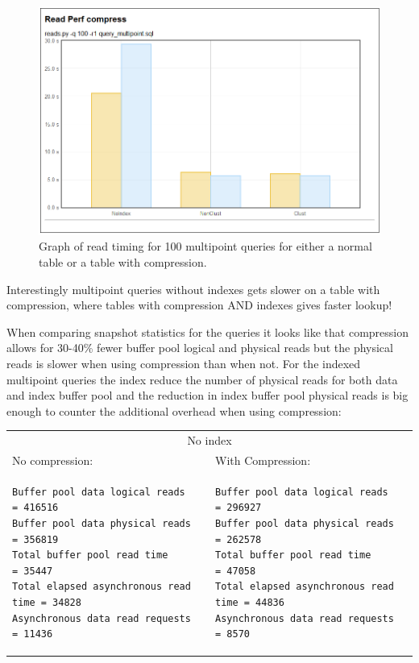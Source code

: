 \begin{figure}
  \centering
  \includegraphics[width=12cm]{assignment3/readcomp}
  \caption[Read performance - Clustering Index compress]{Graph of read timing
  for 100 multipoint queries for either a normal table or a table with
  compression.}\label{fig:readcomp}
\end{figure}

Interestingly multipoint queries without indexes gets slower on a table with
compression, where tables with compression AND indexes gives faster lookup!

When comparing snapshot statistics for the queries it looks like that
compression allows for 30-40\% fewer buffer pool logical and physical reads  but
the physical reads is slower when using compression than when not. For the
indexed multipoint queries the index reduce the number of physical reads for
both data and index buffer pool and the reduction in index buffer pool physical
reads is big enough to counter the additional overhead when using compression:

\noindent\begin{tabular}{p{6.6cm}|p{6.6cm}}
  \multicolumn{2}{c}{No index}\\
No compression:&With Compression:\\ \hline
\noindent\footnotesize\protect\begin{verbatim}
Buffer pool data logical reads       = 416516
Buffer pool data physical reads      = 356819
Total buffer pool read time          = 35447
Total elapsed asynchronous read time = 34828
Asynchronous data read requests      = 11436
\end{verbatim}
&
\noindent\footnotesize\protect\begin{verbatim}
Buffer pool data logical reads       = 296927
Buffer pool data physical reads      = 262578
Total buffer pool read time          = 47058
Total elapsed asynchronous read time = 44836
Asynchronous data read requests      = 8570
\end{verbatim}
\\ \hline
\end{tabular}


